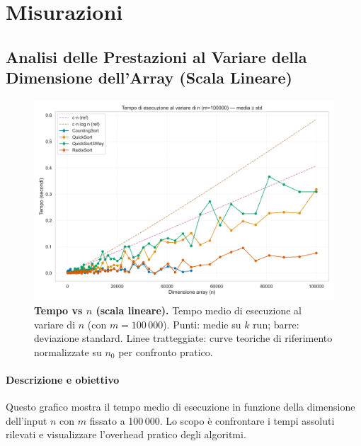 \documentclass[a4paper, 11pt]{article}
\begin{document}
\section{Misurazioni}

\subsection{Analisi delle Prestazioni al Variare della Dimensione dell'Array (Scala Lineare)}
\begin{figure}[H]
    \centering
    \includegraphics[width=\textwidth]{./Immagini/tempo_vs_n_lineare_improved.png}
    \caption*{\textbf{Tempo vs \(n\) (scala lineare).} Tempo medio di esecuzione al variare di \(n\) (con \(m=100\,000\)). Punti: medie su \(k\) run; barre: deviazione standard. Linee tratteggiate: curve teoriche di riferimento normalizzate su \(n_0\) per confronto pratico.}
    \label{fig:grafico}
\end{figure}

\paragraph{Descrizione e obiettivo}
Questo grafico mostra il tempo medio di esecuzione in funzione della dimensione dell'input \(n\) con \(m\) fissato a 100\,000. Lo scopo è confrontare i tempi assoluti rilevati e visualizzare l'overhead pratico degli algoritmi.
\end{document}
